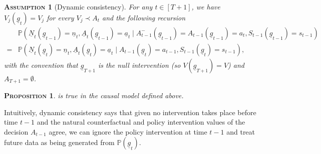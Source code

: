 \documentclass[12pt,a4paper]{article}
\newtheorem{assumption}{\normalfont\scshape Assumption}
\newtheorem{proposition}[theorem]{\normalfont\scshape  Proposition}
\theoremstyle{definition}
\newcommand{\PP}[0]{\mathbb{P}}
\newcommand{\pa}[0]{\text{pa}}
\begin{document}
\begin{assumption}[Dynamic consistency] \label{assump:dynamic-consistency}
For any $t \in [T+1]$, we have $V_j(\underline{g}_t) = V_j%
$ for every $V_j \prec A_{t}$ and the following recursion
    \begin{equation} \label{eq:dynamic-consistency}
        \begin{split}
            &\PP(\underline{N}_t(\underline{g}_{t-1}) =
              \underline{n}_t, \underline{A}_t(\underline{g}_{t-1}) =
              \underline{a}_t \mid A_{t-1}^{-}(\underline{g}_{t-1}) =
              A_{t-1}(\underline{g}_{t-1}) = a_t,
              S_{t-1}(\underline{g}_{t-1}) = s_{t-1}) \\
            = &\PP(\underline{N}_t(\underline{g}_{t}) =
                \underline{n}_t, \underline{A}_t(\underline{g}_{t}) =
                \underline{a}_t \mid A_{t-1}(\underline{g}_{t}) =
                a_{t-1}, S_{t-1}(\underline{g}_{t}) = s_{t-1}),
        \end{split}
      \end{equation}
      with the convention that $\underline{g}_{T+1}$ is the null
      intervention (so $V(\underline{g}_{T+1}) = V$) and $A_{T+1} =
      \emptyset$.
\end{assumption}

\begin{proposition} \label{prop:dynamic-consistency}
   is true in the causal model
  defined above.
\end{proposition}
Intuitively, dynamic consistency says that given
no intervention takes place before time $t-1$ and the natural
counterfactual and policy intervention values of the decision
$A_{t-1}$ agree, we can ignore the policy intervention at time $t-1$
and treat future data as being generated from
$\PP(\underline{g}_t)$. %
\end{document}
